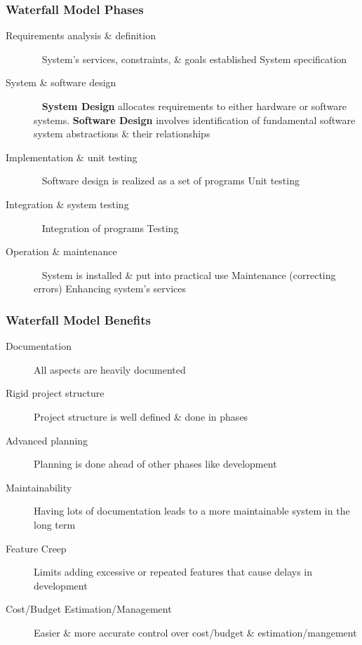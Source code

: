 \documentclass{report}
\begin{document}
\subsubsection{Waterfall Model Phases} 
\begin{description}
  \item [Requirements analysis \& definition] \ \newline
  System’s services, constraints, \& goals established \newline
  System specification
  \item [System \& software design] \ \newline
  \textbf{System Design} allocates requirements to either hardware or software systems. \newline
  \textbf{Software Design} involves identification of fundamental software system abstractions \& their relationships
  \item [Implementation \& unit testing] \ \newline
  Software design is realized as a set of programs \newline
  Unit testing
  \item [Integration \& system testing] \ \newline
  Integration of programs \newline
  Testing
  \item [Operation \& maintenance] \ \newline
  System is installed \& put into practical use \newline
  Maintenance (correcting errors) \newline
  Enhancing system’s services
\end{description}

\subsubsection{Waterfall Model Benefits}
\begin{description}
  \item [Documentation] All aspects are heavily documented
  \item [Rigid project structure] Project structure is well defined \& done in phases
  \item [Advanced planning] Planning is done ahead of other phases like development
  \item [Maintainability] Having lots of documentation leads to a more maintainable system in the long term
  \item [Feature Creep] Limits adding excessive or repeated features that cause delays in development
  \item [Cost/Budget Estimation/Management] Easier \& more accurate control over cost/budget \& estimation/mangement
\end{description}
\end{document}
